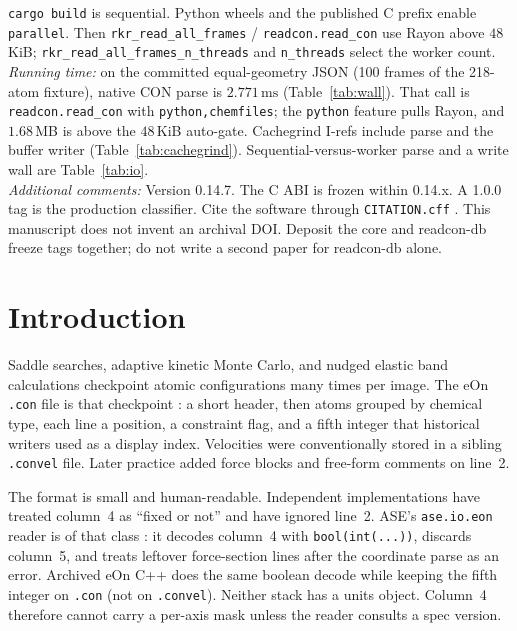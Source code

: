 \documentclass[preprint,12pt]{elsarticle}
\begin{document}
\texttt{cargo build} is sequential. Python wheels and the published
C prefix enable \texttt{parallel}. Then
\texttt{rkr\_read\_all\_frames} / \texttt{readcon.read\_con} use
Rayon above $48$\,KiB; \texttt{rkr\_read\_all\_frames\_n\_threads}
and \texttt{n\_threads} select the worker count.\\
\textit{Running time:} on the committed equal-geometry JSON (100
frames of the 218-atom fixture), native CON parse is
$2.771\,\mathrm{ms}$ (Table~\ref{tab:wall}). That call is
\texttt{readcon.read\_con} with \texttt{python,chemfiles}; the
\texttt{python} feature pulls Rayon, and $1.68$\,MB is above the
$48$\,KiB auto-gate. Cachegrind I-refs include parse and the
buffer writer (Table~\ref{tab:cachegrind}). Sequential-versus-worker
parse and a write wall are Table~\ref{tab:io}.\\
\textit{Additional comments:} Version 0.14.7. The C ABI is frozen
within 0.14.x. A 1.0.0 tag is the production classifier. Cite the
software through \texttt{CITATION.cff}
\cite{smithSoftwareCitationPrinciples2016}. This manuscript does not
invent an archival DOI. Deposit the core and readcon-db freeze tags
together; do not write a second paper for readcon-db alone.

\section{Introduction}

Saddle searches, adaptive kinetic Monte Carlo, and nudged elastic
band calculations checkpoint atomic configurations many times per
image. The eOn \texttt{.con} file is that checkpoint
\cite{chillEONSoftwareLong2014}: a short header, then atoms grouped
by chemical type, each line a position, a constraint flag, and a
fifth integer that historical writers used as a display index.
Velocities were conventionally stored in a sibling \texttt{.convel}
file. Later practice added force blocks and free-form comments on
line~2.

The format is small and human-readable. Independent implementations
have treated column~4 as ``fixed or not'' and have ignored line~2.
ASE's \texttt{ase.io.eon} reader is of that class
\cite{larsenAtomicSimulationEnvironment2017}: it decodes column~4
with \texttt{bool(int(...))}, discards column~5, and treats leftover
force-section lines after the coordinate parse as an error.
Archived eOn C++ does the same boolean decode while keeping the
fifth integer on \texttt{.con} (not on \texttt{.convel}). Neither
stack has a units object. Column~4 therefore cannot carry a per-axis
mask unless the reader consults a spec version.
\end{document}
